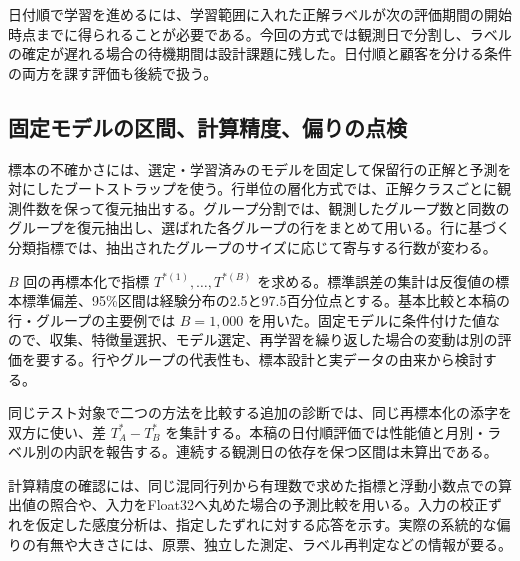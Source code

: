 日付順で学習を進めるには、学習範囲に入れた正解ラベルが次の評価期間の開始時点までに得られることが必要である。今回の方式では観測日で分割し、ラベルの確定が遅れる場合の待機期間は設計課題に残した。日付順と顧客を分ける条件の両方を課す評価も後続で扱う。

\subsection{固定モデルの区間、計算精度、偏りの点検}

標本の不確かさには、選定・学習済みのモデルを固定して保留行の正解と予測を対にしたブートストラップを使う\cite{efron1979}。行単位の層化方式では、正解クラスごとに観測件数を保って復元抽出する。グループ分割では、観測したグループ数と同数のグループを復元抽出し、選ばれた各グループの行をまとめて用いる。行に基づく分類指標では、抽出されたグループのサイズに応じて寄与する行数が変わる。

\(B\) 回の再標本化で指標 \(T^{*(1)},\ldots,T^{*(B)}\) を求める。標準誤差の集計は反復値の標本標準偏差、95\%区間は経験分布の2.5と97.5百分位点とする。基本比較と本稿の行・グループの主要例では \(B=1{,}000\) を用いた。固定モデルに条件付けた値なので、収集、特徴量選択、モデル選定、再学習を繰り返した場合の変動は別の評価を要する。行やグループの代表性も、標本設計と実データの由来から検討する。

同じテスト対象で二つの方法を比較する追加の診断では、同じ再標本化の添字を双方に使い、差 \(T_A^*-T_B^*\) を集計する。本稿の日付順評価では性能値と月別・ラベル別の内訳を報告する。連続する観測日の依存を保つ区間は未算出である。

計算精度の確認には、同じ混同行列から有理数で求めた指標と浮動小数点での算出値の照合や、入力をFloat32へ丸めた場合の予測比較を用いる。入力の校正ずれを仮定した感度分析は、指定したずれに対する応答を示す。実際の系統的な偏りの有無や大きさには、原票、独立した測定、ラベル再判定などの情報が要る\cite{ranking}。
